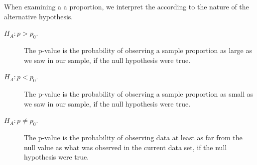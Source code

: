 \begin{termBox}{
When examining a a proportion, we interpret the  according to the nature of the alternative hypothesis.
\begin{description}
\item[$H_A: p > p_0.$ ] The p-value is the probability of observing a sample proportion as large as we saw in our sample, if the null hypothesis were true.
\item[$H_A: p < p_0.$ ]The p-value is the probability of observing a sample proportion as small as we saw in our sample, if the null hypothesis were true.
\item[$H_A: p \ne p_0.$] The p-value is the probability of observing data at least as far from the null value as what was observed in the current data set, if the null hypothesis were true.
\end{description}}
\end{termBox}

